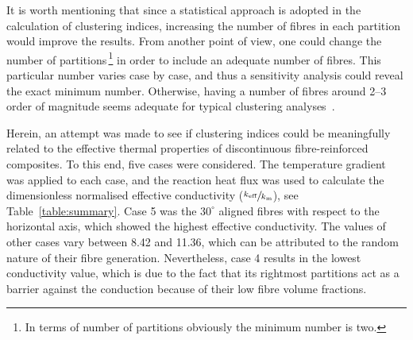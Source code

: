 	It is worth mentioning that since a statistical approach is adopted in the calculation of clustering indices, increasing the number of fibres in each partition would improve the results. From another point of view, one could change the number of partitions\,\footnote{In terms of number of partitions obviously the minimum number is two.} in order to include an adequate number of fibres. This particular number varies case by case, and thus a sensitivity analysis could reveal the exact minimum number.  Otherwise, having a number of fibres around 2--3 order of magnitude seems adequate for typical clustering analyses~\autocite{Ranganathan.1990}.
	
	Herein, an attempt was made to see if clustering indices could be meaningfully related to the effective thermal properties of discontinuous fibre-reinforced composites. To this end, five cases were considered. The temperature gradient was applied to each case, and the reaction heat flux was used to calculate the dimensionless normalised effective conductivity ($\sfrac{k_{\text{eff}}}{k_{\text{m}}}$), see Table~\ref{table:summary}. Case 5 was the $30^\circ$ aligned fibres with respect to the horizontal axis, which showed the highest effective conductivity. The values of other cases vary between 8.42 and 11.36, which can be attributed to the random nature of their fibre generation. Nevertheless, case 4 results in the lowest conductivity value, which is due to the fact that its rightmost partitions act as a barrier against the conduction because of their low fibre volume fractions.\bl

